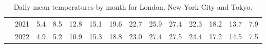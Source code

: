 \begin{table}[htbp]
\begin{adjustwidth}{-1in}{-1in}
\begin{tabular}{llrrrrrrrrrrrr}
      & 2021 &  5.4 &  8.5 &  12.8 &  15.1 &  19.6 &  22.7 &  25.9 &  27.4 &  22.3 &  18.2 &  13.7 &   7.9 \\
      & 2022 &  4.9 &  5.2 &  10.9 &  15.3 &  18.8 &  23.0 &  27.4 &  27.5 &  24.4 &  17.2 &  14.5 &   7.5 \\
\bottomrule
\end{tabular}
\caption[Daily mean temperature]{Daily mean temperatures by month for London, New York City and Tokyo.}
\label{table:mean_temp}
\end{adjustwidth}
\end{table}

\newpage
